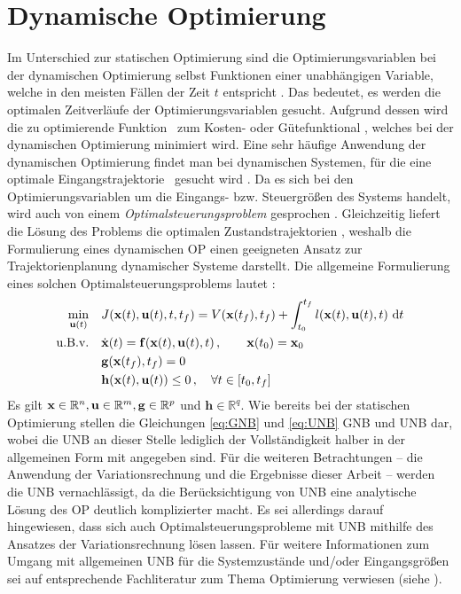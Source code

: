 \section{Dynamische Optimierung}\label{sec:dynamischeOpt}
Im Unterschied zur statischen Optimierung sind die Optimierungsvariablen bei der dynamischen Optimierung selbst Funktionen einer unabhängigen Variable, welche in den meisten Fällen der Zeit $t$ entspricht \cite{KnutGraichen.2012}. Das bedeutet, es werden die optimalen Zeitverläufe der Optimierungsvariablen gesucht. Aufgrund dessen wird die zu optimierende Funktion \fofx~zum Kosten- oder Gütefunktional \J, welches bei der dynamischen Optimierung minimiert wird. Eine sehr häufige Anwendung der dynamischen Optimierung findet man bei dynamischen Systemen, für die eine optimale Eingangstrajektorie \uoptoft~gesucht wird \cite{KnutGraichen.2012}. Da es sich bei den Optimierungsvariablen um die Eingangs- bzw. Steuergrößen des Systems handelt, wird auch von einem \textit{Optimalsteuerungsproblem} gesprochen \cite{KnutGraichen.2012}. Gleichzeitig liefert die Lösung des Problems die optimalen Zustandstrajektorien \xoptoft, weshalb die Formulierung eines dynamischen \gls{OP} einen geeigneten Ansatz zur Trajektorienplanung dynamischer Systeme darstellt. 
Die allgemeine Formulierung eines solchen Optimalsteuerungsproblems lautet \cite{KnutGraichen.2012}:
\begin{align}
\min_{\boldsymbol{\mathrm{u}}(t)} \quad &J(\boldsymbol{\mathrm{x}}(t),\boldsymbol{\mathrm{u}}(t),t,t_f) = V(\boldsymbol{\mathrm{x}}(t_f),t_f) + \int_{t_0}^{t_f}l(\boldsymbol{\mathrm{x}}(t),\boldsymbol{\mathrm{u}}(t),t)~\textrm{d}{t} \label{eq:J_dyn}\\
\textrm{u.B.v.} \quad& \dot{\boldsymbol{\mathrm{x}}}(t) = \boldsymbol{\mathrm{f}}(\boldsymbol{\mathrm{x}}(t),\boldsymbol{\mathrm{u}}(t),t)\,,\qquad \boldsymbol{\mathrm{x}}(t_0) = \boldsymbol{\mathrm{x}}_0 \label{eq:system_anfang}\\
&\mathbf{g}(\boldsymbol{\mathrm{x}}(t_f),t_f) = 0 \label{eq:GNB}\\
&\mathbf{h}(\boldsymbol{\mathrm{x}}(t),\boldsymbol{\mathrm{u}}(t)) \leq 0\,,\quad \forall t \in [t_0, t_f] \label{eq:UNB}
\end{align}
Es gilt $\boldsymbol{\mathrm{x}}\in\mathbb{R}^n, \boldsymbol{\mathrm{u}}\in\mathbb{R}^m, \mathbf{g}\in\mathbb{R}^p$ und $\mathbf{h}\in\mathbb{R}^q$. Wie bereits bei der statischen Optimierung stellen die Gleichungen \eqref{eq:GNB} und \eqref{eq:UNB} \gls{GNB} und \gls{UNB} dar, wobei die \gls{UNB} an dieser Stelle lediglich der Vollständigkeit halber in der allgemeinen Form mit angegeben sind. Für die weiteren Betrachtungen -- die Anwendung der Variationsrechnung und die Ergebnisse dieser Arbeit -- werden die \gls{UNB} vernachlässigt, da die Berücksichtigung von \gls{UNB} eine analytische Lösung des \gls{OP} deutlich komplizierter macht. Es sei allerdings darauf hingewiesen, dass sich auch Optimalsteuerungsprobleme mit \gls{UNB} mithilfe des Ansatzes der Variationsrechnung lösen lassen. Für weitere Informationen zum Umgang mit allgemeinen \gls{UNB} für die Systemzustände und/oder Eingangsgrößen sei auf entsprechende Fachliteratur zum Thema Optimierung verwiesen (siehe \cite{Papageorgiou.2012, Gerdts.2010}). 


